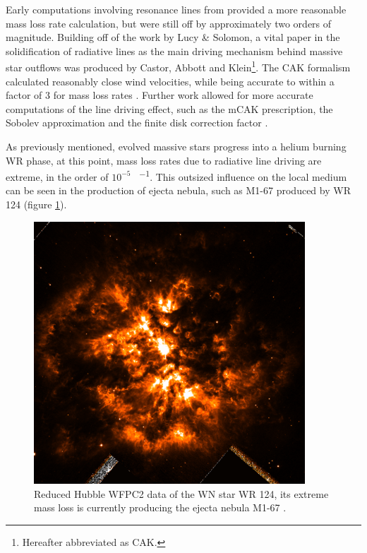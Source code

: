 

Early computations involving resonance lines from \textcite{lucy_mass_1970} provided a more reasonable mass loss rate calculation, but were still off by approximately two orders of magnitude.
Building off of the work by Lucy \& Solomon, a vital paper in the solidification of radiative lines as the main driving mechanism behind massive star outflows was produced by Castor, Abbott and Klein\footnote{Hereafter abbreviated as CAK.}.
The CAK formalism calculated reasonably close wind velocities, while being accurate to within a factor of 3 for mass loss rates \parencite{castor_radiation-driven_1975}.
Further work allowed for more accurate computations of the line driving effect, such as the mCAK prescription, the Sobolev approximation and the finite disk correction factor \parencite{pauldrachRadiationdrivenWindsHot1986}.


As previously mentioned, evolved massive stars progress into a helium burning WR phase, at this point, mass loss rates due to radiative line driving are extreme, in the order of $10^{-5}$ \si{\solarmass\per\year}.
This outsized influence on the local medium can be seen in the production of ejecta nebula, such as M1-67 produced by WR 124 (figure \ref{fig:wr124}).

\begin{figure}[h]
  \centering
  \includegraphics[width=4in]{assets/WR124.png}
  \caption[\textit{M1-67 nebula around WR 124 \parencite{2010ApJ...724L..90M}}]{Reduced Hubble WFPC2 data of the WN star WR 124, its extreme mass loss is currently producing the ejecta nebula M1-67 \parencite{2010ApJ...724L..90M}.}
  \label{fig:wr124}
\end{figure}

